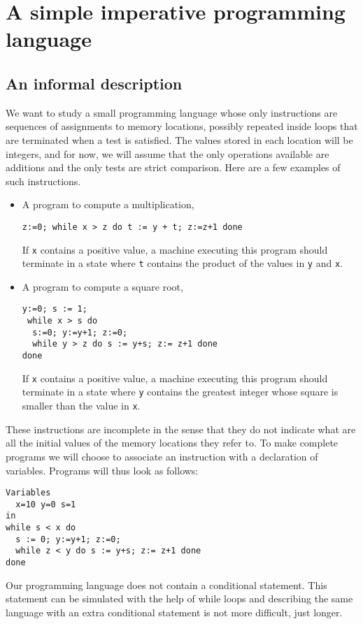 \documentclass{book}
\begin{document}
\chapter{A simple imperative programming language}
\section{An informal description}
We want to study a small programming language whose only instructions
are sequences of assignments to memory locations, possibly repeated inside
loops that are terminated when a test is satisfied.
The values stored in each location will be integers, and for now, we will
assume that the only operations available are additions and the only
tests are strict comparison.  Here are a few examples of such instructions.

\begin{itemize}
  \item A program to compute a multiplication,
\begin{verbatim}
z:=0; while x > z do t := y + t; z:=z+1 done
\end{verbatim}
If {\tt x} contains a positive value, a machine executing this program
should terminate in a state where {\tt t} contains the product of the values
in {\tt y} and {\tt x}.
\item A program to compute a square root,
\begin{verbatim}
y:=0; s := 1;
 while x > s do
  s:=0; y:=y+1; z:=0;
  while y > z do s := y+s; z:= z+1 done
done
\end{verbatim}
If {\tt x} contains a positive value, a machine executing this program
should terminate in a state where {\tt y} contains the greatest integer
whose square is smaller than the value in {\tt x}.
\end{itemize}

These instructions are incomplete in the sense that they do not
indicate what are all the initial values of the memory locations they
refer to.  To make complete programs we will choose to associate
an instruction with a declaration of variables.  Programs will thus
look as follows:
\begin{verbatim}
Variables 
  x=10 y=0 s=1
in
while s < x do
  s := 0; y:=y+1; z:=0;
  while z < y do s := y+s; z:= z+1 done
done
\end{verbatim}

Our programming language does not contain a conditional statement.
This statement can be simulated with the help
of while loops and describing the same language with an extra 
conditional statement is not more difficult, just longer.
\end{document}
